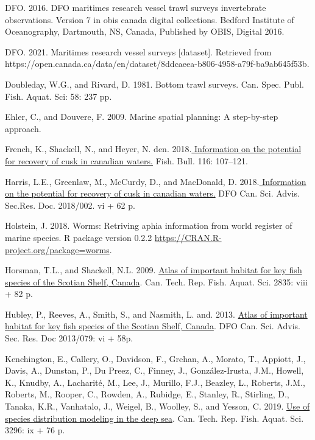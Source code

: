 \documentclass[12pt]{article}\usepackage[]{graphicx}\usepackage[]{color}
\begin{document}
\leavevmode\hypertarget{ref-DFO:2016}{}%
DFO. 2016. DFO maritimes research vessel trawl surveys invertebrate observations. Version 7 in obis canada digital collections. Bedford Institute of Oceanography, Dartmouth, NS, Canada, Published by OBIS, Digital 2016.

\leavevmode\hypertarget{ref-OpenData_MAR_RV}{}%
DFO. 2021. Maritimes research vessel surveys {[}dataset{]}. Retrieved from https://open.canada.ca/data/en/dataset/8ddcaeea-b806-4958-a79f-ba9ab645f53b.

\leavevmode\hypertarget{ref-DoubledayRivard1981}{}%
Doubleday, W.G., and Rivard, D. 1981. Bottom trawl surveys. Can. Spec. Publ. Fish. Aquat. Sci: 58: 237 pp.

\leavevmode\hypertarget{ref-Ehler:2009}{}%
Ehler, C., and Douvere, F. 2009. Marine spatial planning: A step-by-step approach.

\leavevmode\hypertarget{ref-French:2018}{}%
French, K., Shackell, N., and Heyer, N. den. 2018.\href{https://www.st.nmfs.noaa.gov/spo/FishBull/1162/french.pdf}{ Information on the potential for recovery of cusk in canadian waters.} Fish. Bull. 116: 107--121.

\leavevmode\hypertarget{ref-Harris:2018}{}%
Harris, L.E., Greenlaw, M., McCurdy, D., and MacDonald, D. 2018.\href{http://publications.gc.ca/collections/collection_2018/mpo-dfo/fs70-5/Fs70-5-2018-002-eng.pdf}{ Information on the potential for recovery of cusk in canadian waters.} DFO Can. Sci. Advis. Sec.Res. Doc. 2018/002. vi + 62 p.

\leavevmode\hypertarget{ref-R:package:worms}{}%
Holstein, J. 2018. Worms: Retriving aphia information from world register of marine species. R package version 0.2.2 \url{https://CRAN.R-project.org/package=worms}.

\leavevmode\hypertarget{ref-Horsman:atlas:2009}{}%
Horsman, T.L., and Shackell, N.L. 2009. \href{http://publications.gc.ca/site/eng/353896/publication.html}{Atlas of important habitat for key fish species of the Scotian Shelf, Canada}. Can. Tech. Rep. Fish. Aquat. Sci. 2835: viii + 82 p.

\leavevmode\hypertarget{ref-Hubley2013}{}%
Hubley, P., Reeves, A., Smith, S., and Nasmith, L. and. 2013. \href{https://waves-vagues.dfo-mpo.gc.ca/Library/360651.pdf}{Atlas of important habitat for key fish species of the Scotian Shelf, Canada}. DFO Can. Sci. Advis. Sec. Res. Doc 2013/079: vi + 58p.

\leavevmode\hypertarget{ref-Kenchington2019}{}%
Kenchington, E., Callery, O., Davidson, F., Grehan, A., Morato, T., Appiott, J., Davis, A., Dunstan, P., Du Preez, C., Finney, J., González-Irusta, J.M., Howell, K., Knudby, A., Lacharité, M., Lee, J., Murillo, F.J., Beazley, L., Roberts, J.M., Roberts, M., Rooper, C., Rowden, A., Rubidge, E., Stanley, R., Stirling, D., Tanaka, K.R., Vanhatalo, J., Weigel, B., Woolley, S., and Yesson, C. 2019. \href{https://waves-vagues.dfo-mpo.gc.ca/Library/40766299.pdf}{Use of species distribution modeling in the deep sea}. Can. Tech. Rep. Fish. Aquat. Sci. 3296: ix + 76 p.
\end{document}

